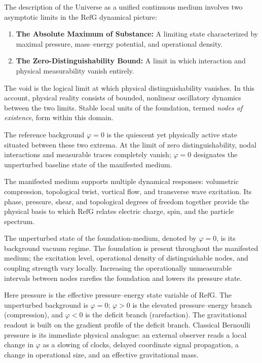 \documentclass[11pt,a4paper]{article}
\newcommand{\RefG}{\mathrm{RefG}}
\begin{document}
The description of the Universe as a unified continuous medium involves two asymptotic limits in the $\RefG$ dynamical picture:
\begin{enumerate}[label=\arabic*.]
\item \textbf{The Absolute Maximum of Substance:} A limiting state characterized by maximal pressure, mass--energy potential, and operational density.
\item \textbf{The Zero-Distinguishability Bound:} A limit in which interaction and physical measurability vanish entirely.
\end{enumerate}

The void is the logical limit at which physical distinguishability vanishes. In this account, physical reality consists of bounded, nonlinear oscillatory dynamics between the two limits. Stable local units of the foundation, termed \emph{nodes of existence}, form within this domain.

The reference background $\varphi = 0$ is the quiescent yet physically active state situated between these two extrema. At the limit of zero distinguishability, nodal interactions and measurable traces completely vanish; $\varphi = 0$ designates the unperturbed baseline state of the manifested medium.

The manifested medium supports multiple dynamical responses: volumetric compression, topological twist, vortical flow, and transverse wave excitation. Its phase, pressure, shear, and topological degrees of freedom together provide the physical basis to which $\RefG$ relates electric charge, spin, and the particle spectrum.

The unperturbed state of the foundation-medium, denoted by $\varphi=0$, is its background vacuum regime. The foundation is present throughout the manifested medium; the excitation level, operational density of distinguishable nodes, and coupling strength vary locally. Increasing the operationally unmeasurable intervals between nodes rarefies the foundation and lowers its pressure state.

Here pressure is the effective pressure--energy state variable of $\RefG$. The unperturbed background is $\varphi=0$; $\varphi>0$ is the elevated pressure--energy branch (compression), and $\varphi<0$ is the deficit branch (rarefaction). The gravitational readout is built on the gradient profile of the deficit branch. Classical Bernoulli pressure is its immediate physical analogue: an external observer reads a local change in $\varphi$ as a slowing of clocks, delayed coordinate signal propagation, a change in operational size, and an effective gravitational mass.
\end{document}
